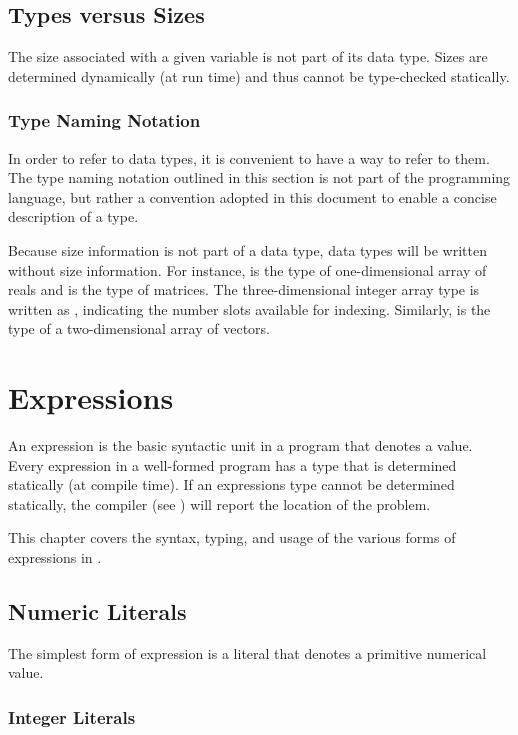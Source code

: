 \section{Types versus Sizes}

The size associated with a given variable is not part of its data
type.  Sizes are determined dynamically (at run time) and thus
cannot be type-checked statically.  

\subsection{Type Naming Notation}

In order to refer to data types, it is convenient to have a way to
refer to them.  The type naming notation outlined in this section is
not part of the \Stan programming language, but rather a convention
adopted in this document to enable a concise description of a type.

Because size information is not part of a data type, data
types will be written without size information.  For instance,
 is the type of one-dimensional array of reals and
 is the type of matrices.  The three-dimensional integer
array type is written as , indicating the number slots
available for indexing.  Similarly,  is the type of a
two-dimensional array of vectors.


\chapter{Expressions}

\noindent 
An expression is the basic syntactic unit in a \Stan program that
denotes a value.  Every expression in a well-formed \Stan program has
a type that is determined statically (at compile time).  If an
expressions type cannot be determined statically, the \Stan compiler
(see ) will report the location of the problem.

This chapter covers the syntax, typing, and usage of the various forms
of expressions in \Stan. 

\section{Numeric Literals}

The simplest form of expression is a literal that denotes a primitive
numerical value.   

\subsection{Integer Literals}

